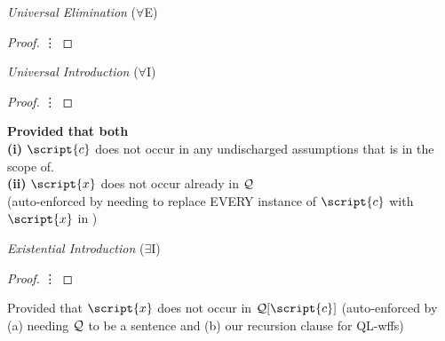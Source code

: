 \begin{multicols}{2}

\textit{Universal Elimination} ($\forall$E) 

\begin{proof}
	 {\hspace{2em} \vdots}
	 
\end{proof}


\vspace{2.5em}

\textit{Universal Introduction} ($\forall$I) 

\begin{proof}
	 {\hspace{2em} \vdots}
	 
\end{proof}

\textbf{Provided that both} \\
\textbf{(i)} $\script{c}$ does not occur in any undischarged assumptions that  is in the scope of. \\
\textbf{(ii)} $\script{x}$ does not occur already in $\mathcal{Q}$ \\ (auto-enforced by needing to replace EVERY instance of $\script{c}$ with $\script{x}$  in )



\vfill\null
\columnbreak

\textit{Existential Introduction} ($\exists$I)

\begin{proof}
	 {\hspace{2em} \vdots}
 
\end{proof}

Provided that $\script{x}$ does not occur in $\metav{Q}[\script{c}]$ (auto-enforced by (a) needing $\mathcal{Q}$ to be a sentence and (b) our recursion clause for QL-wffs) %






\end{multicols}
